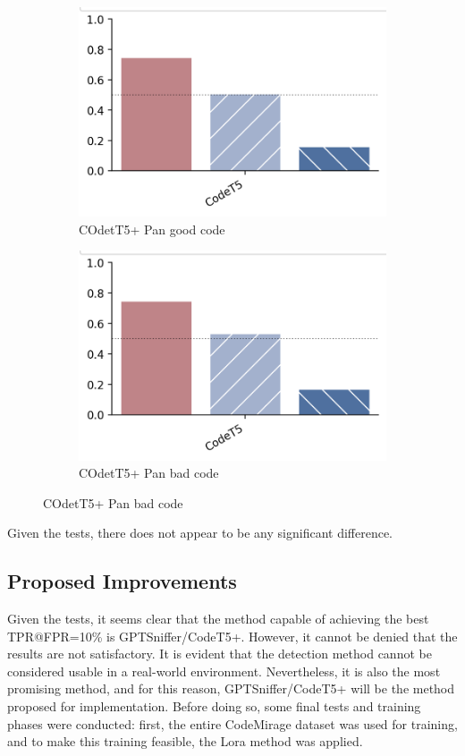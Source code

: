 \begin{figure}[H]
    \begin{subfigure}[b]{0.4\textwidth}
        \centering
        \includegraphics[width=\linewidth]{img/ok.png}
        \caption{COdetT5+ Pan good code}
        \label{fig:6}
    \end{subfigure}
    \hfill
    \begin{subfigure}[b]{0.4\textwidth}
        \centering
        \includegraphics[width=\linewidth]{img/no.png}
        \caption{COdetT5+ Pan bad code}
        \label{fig:b6}
    \end{subfigure}
\end{figure}
Given the tests, there does not appear to be any significant difference.

\subsection{Proposed Improvements}
Given the tests, it seems clear that the method capable of achieving 
the best TPR@FPR=10\% is GPTSniffer/CodeT5+. However, it cannot be denied 
that the results are not satisfactory. It is evident that the detection 
method cannot be considered usable in a real-world environment. Nevertheless, 
it is also the most promising method, and for this reason, GPTSniffer/CodeT5+ 
will be the method proposed for implementation. Before doing so, some final 
tests and training phases were conducted: first, the entire CodeMirage 
dataset was used for training, and to make this training feasible, the 
Lora method was applied.


